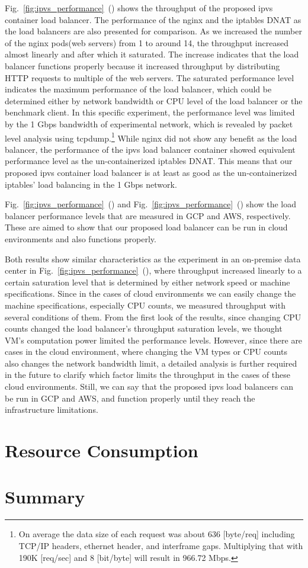 
Fig.~\ref{fig:ipvs_performance}~() shows the throughput of the proposed ipvs container load balancer.
The performance of the nginx and the iptables DNAT as the load balancers are also presented for comparison.
As we increased the number of the nginx pods(web servers) from 1 to around 14, the throughput increased almost linearly and after which it saturated.
The increase indicates that the load balancer functions properly because it increased throughput by distributing HTTP requests to multiple of the web servers.
The saturated performance level indicates the maximum performance of the load balancer, which could be determined either by network bandwidth or CPU level of the load balancer or the benchmark client.
In this specific experiment, the performance level was limited by the 1 Gbps bandwidth of experimental network\cite{takahashi2018portable}, which is revealed by packet level analysis using tcpdump.\footnote{
On average the data size of each request was about 636 [byte/req] including TCP/IP headers, ethernet header, and interframe gaps.
Multiplying that with 190K [req/sec] and 8 [bit/byte] will result in 966.72 Mbps.
}
While nginx did not show any benefit as the load balancer, the performance of the ipvs load balancer container showed equivalent performance level as the un-containerized iptables DNAT.
This means that our proposed ipvs container load balancer is at least as good as the un-containerized iptables' load balancing in the 1 Gbps network.

Fig.~\ref{fig:ipvs_performance}~() and Fig.~\ref{fig:ipvs_performance}~() show the load balancer performance levels that are measured in GCP and AWS, respectively.
These are aimed to show that our proposed load balancer can be run in cloud environments and also functions properly.

Both results show similar characteristics as the experiment in an on-premise data center in Fig.~\ref{fig:ipvs_performance}~(), where throughput increased linearly to a certain saturation level that is determined by either network speed or machine specifications.
Since in the cases of cloud environments we can easily change the machine specifications, especially CPU counts, we measured throughput with several conditions of them.
From the first look of the results, since changing CPU counts changed the load balancer's throughput saturation levels, we thought VM's computation power limited the performance levels.
However, since there are cases in the cloud environment, where changing the VM types or CPU counts also changes the network bandwidth limit, a detailed analysis is further required in the future to clarify which factor limits the throughput in the cases of these cloud environments.
Still, we can say that the proposed ipvs load balancers can be run in GCP and AWS, and function properly until they reach the infrastructure limitations.

\section{Resource Consumption}

\section{Summary}



